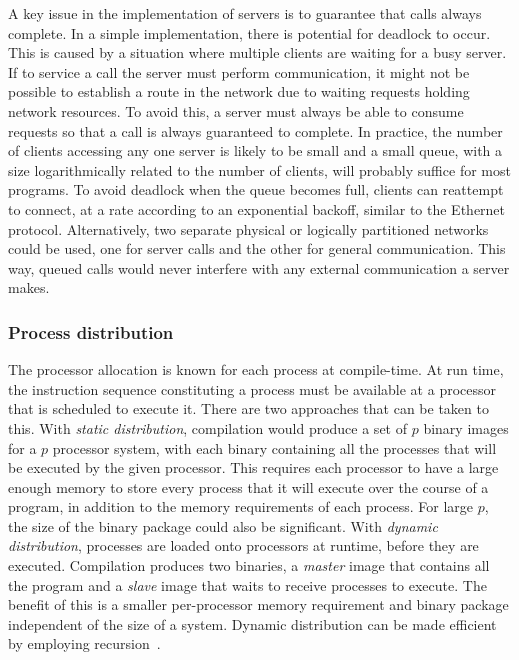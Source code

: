 \documentclass[11pt, conference, compsocconf, onecolumn]{IEEEtran}
\newcounter{process}
\begin{document}
A key issue in the implementation of servers is to guarantee that calls always
complete. In a simple implementation, there is potential for deadlock to occur.
This is caused by a situation where multiple clients are waiting for a busy
server. If to service a call the server must perform communication, it might
not be possible to establish a route in the network due to waiting requests
holding network resources.
To avoid this, a server must always be able to consume requests so that a call
is always guaranteed to complete. In practice, the number of clients accessing
any one server is likely to be small and a small queue, with a size
logarithmically related to the number of clients, will probably suffice for most
programs. To avoid deadlock when the queue becomes full, clients can reattempt
to connect, at a rate according to an exponential backoff, similar to the
Ethernet protocol.
Alternatively, two separate physical or logically partitioned networks could be
used, one for server calls and the other for general communication. This way,
queued calls would never interfere with any external communication a server
makes.


\subsubsection{Process distribution}

The processor allocation is known for each process at compile-time. At run
time, the instruction sequence constituting a process must be available at a
processor that is scheduled to execute it. There are two approaches that can be
taken to this.
With \emph{static distribution}, compilation would produce a set of $p$ binary
images for a $p$ processor system, with each binary containing all the
processes that will be executed by the given processor. This requires each
processor to have a large enough memory to store every process that it will
execute over the course of a program, in addition to the memory requirements of
each process. For large $p$, the size of the binary package could also be
significant.
With \emph{dynamic distribution}, processes are loaded onto processors at
runtime, before they are executed. Compilation produces two binaries, a
\emph{master} image that contains all the program and a \emph{slave} image that
waits to receive processes to execute. The benefit of this is a smaller
per-processor memory requirement and binary package independent of the size of
a system. Dynamic distribution can be made efficient by employing
recursion~\cite{Hanlon11}.
\end{document}
